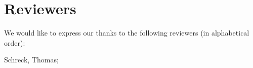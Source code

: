 \section{Reviewers}

We would like to express our thanks to the following reviewers (in alphabetical order):

Schreck, Thomas; 


